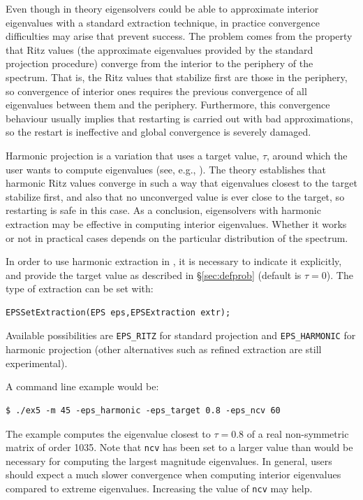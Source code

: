 Even though in theory eigensolvers could be able to approximate interior eigenvalues with a standard extraction technique, in practice convergence difficulties may arise that prevent success. The problem comes from the property that Ritz values (the approximate eigenvalues provided by the standard projection procedure) converge from the interior to the periphery of the spectrum. That is, the Ritz values that stabilize first are those in the periphery, so convergence of interior ones requires the previous convergence of all eigenvalues between them and the periphery. Furthermore, this convergence behaviour usually implies that restarting is carried out with bad approximations, so the restart is ineffective and global convergence is severely damaged.

Harmonic projection is a variation that uses a target value, $\tau$, around which the user wants to compute eigenvalues (see, e.g., \citep{Morgan:2006:HRA}). The theory establishes that harmonic Ritz values converge in such a way that eigenvalues closest to the target stabilize first, and also that no unconverged value is ever close to the target, so restarting is safe in this case. As a conclusion, eigensolvers with harmonic extraction may be effective in computing interior eigenvalues. Whether it works or not in practical cases depends on the particular distribution of the spectrum.

In order to use harmonic extraction in \slepc, it is necessary to indicate it explicitly, and provide the target value as described in \S\ref{sec:defprob} (default is $\tau=0$). The type of extraction can be set with:
        \begin{Verbatim}[fontsize=\small]
        EPSSetExtraction(EPS eps,EPSExtraction extr);
        \end{Verbatim}
Available possibilities are \texttt{EPS\_RITZ} for standard projection and \texttt{EPS\_HARMONIC} for harmonic projection (other alternatives such as refined extraction are still experimental).

A command line example would be:
        \begin{Verbatim}[fontsize=\small]
        $ ./ex5 -m 45 -eps_harmonic -eps_target 0.8 -eps_ncv 60
        \end{Verbatim}
The example computes the eigenvalue closest to $\tau=0.8$ of a real non-symmetric matrix of order 1035. Note that \texttt{ncv} has been set to a larger value than would be necessary for computing the largest magnitude eigenvalues. In general, users should expect a much slower convergence when computing interior eigenvalues compared to extreme eigenvalues. Increasing the value of \texttt{ncv} may help.

